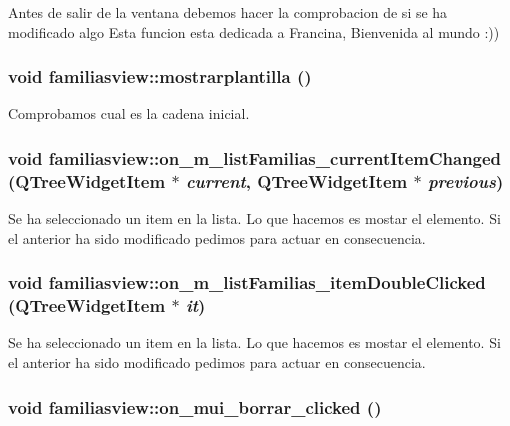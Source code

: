 Antes de salir de la ventana debemos hacer la comprobacion de si se ha modificado algo Esta funcion esta dedicada a Francina, Bienvenida al mundo :)) 
\subsubsection{\setlength{\rightskip}{0pt plus 5cm}void familiasview::mostrarplantilla ()}\label{classfamiliasview_a3}


Comprobamos cual es la cadena inicial. 
\subsubsection{\setlength{\rightskip}{0pt plus 5cm}void familiasview::on\_\-m\_\-list\-Familias\_\-current\-Item\-Changed (QTree\-Widget\-Item $\ast$ {\em current}, QTree\-Widget\-Item $\ast$ {\em previous})\hspace{0.3cm}{\tt  [virtual, slot]}}\label{classfamiliasview_i1}


Se ha seleccionado un item en la lista. Lo que hacemos es mostar el elemento. Si el anterior ha sido modificado pedimos para actuar en consecuencia. 
\subsubsection{\setlength{\rightskip}{0pt plus 5cm}void familiasview::on\_\-m\_\-list\-Familias\_\-item\-Double\-Clicked (QTree\-Widget\-Item $\ast$ {\em it})\hspace{0.3cm}{\tt  [virtual, slot]}}\label{classfamiliasview_i2}


Se ha seleccionado un item en la lista. Lo que hacemos es mostar el elemento. Si el anterior ha sido modificado pedimos para actuar en consecuencia. 
\subsubsection{\setlength{\rightskip}{0pt plus 5cm}void familiasview::on\_\-mui\_\-borrar\_\-clicked ()\hspace{0.3cm}{\tt  [virtual, slot]}}\label{classfamiliasview_i4}


